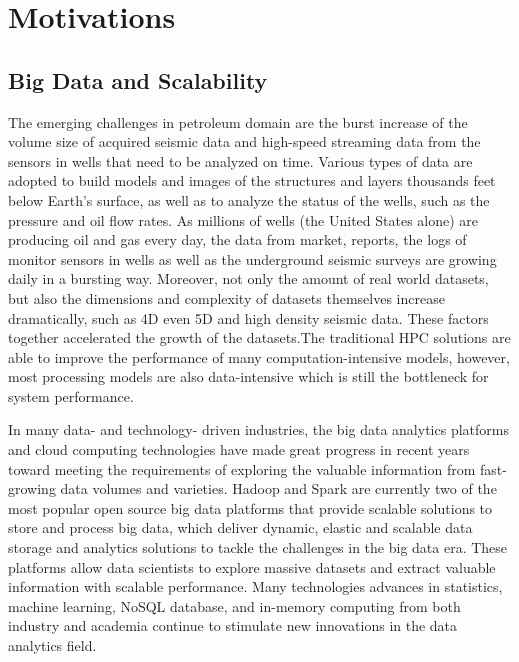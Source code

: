 

\section{Motivations}

\subsection{Big Data and Scalability}

The emerging challenges in petroleum domain are the burst increase of the volume size of acquired seismic data and high-speed streaming data from the sensors in wells that need to be analyzed on time. Various types of data are adopted to build models and images of the structures and layers thousands feet below Earth's surface, as well as to analyze the status of the wells, such as the pressure and oil flow rates. As millions of wells (the United States alone) are producing oil and gas every day, the data from market, reports, the logs of monitor sensors in wells as well as the underground seismic surveys are growing daily in a bursting way\cite{bigdataofindustry}. Moreover, not only the amount of real world datasets, but also the dimensions and complexity of datasets themselves increase dramatically, such as 4D even 5D and high density seismic data. These factors together accelerated the growth of the datasets.The traditional HPC solutions are able to improve the performance of many computation-intensive models, however,  most processing models are also data-intensive which is still the bottleneck for system performance. 

In many data- and technology- driven industries, the big data analytics platforms and cloud computing technologies have made great progress in recent years toward meeting the requirements of exploring the valuable information from fast-growing data volumes and varieties.  Hadoop and Spark are currently two of the most popular open source big data platforms that provide scalable solutions to store and process big data, which deliver dynamic, elastic and scalable data storage and analytics solutions to tackle the challenges in the big data era. These platforms allow data scientists to explore massive datasets and extract valuable information with scalable performance. Many technologies advances in statistics, machine learning, NoSQL database, and in-memory computing from both industry and academia continue to stimulate new innovations in the data analytics field.

